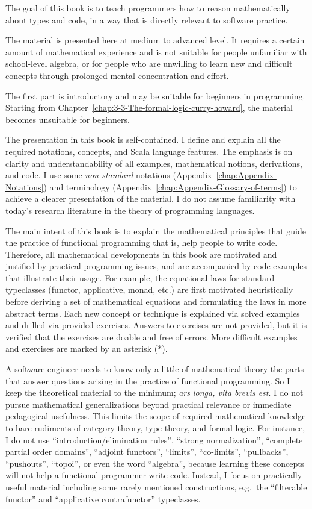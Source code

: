 

The goal of this book is to teach programmers how to reason mathematically
about types and code, in a way that is directly relevant to software
practice.

The material is presented here at medium to advanced level. It requires
a certain amount of mathematical experience and is not suitable for
people unfamiliar with school-level algebra, or for people who are
unwilling to learn new and difficult concepts through prolonged mental
concentration and effort.

The first part is introductory and may be suitable for beginners in
programming. Starting from Chapter~\ref{chap:3-3-The-formal-logic-curry-howard},
the material becomes unsuitable for beginners. 

The presentation in this book is self-contained. I define and explain
all the required notations, concepts, and Scala language features.
The emphasis is on clarity and understandability of all examples,
mathematical notions, derivations, and code. I use some \emph{non-standard}
notations (Appendix~\ref{chap:Appendix-Notations}) and terminology
(Appendix~\ref{chap:Appendix-Glossary-of-terms}) to achieve a clearer
presentation of the material. I do not assume familiarity with today's
research literature in the theory of programming languages.

The main intent of this book is to explain the mathematical principles
that guide the practice of functional programming \textendash{} that
is, help people to write code. Therefore, all mathematical developments
in this book are motivated and justified by practical programming
issues, and are accompanied by code examples that illustrate their
usage. For example, the equational laws for standard typeclasses (functor,
applicative, monad, etc.) are first motivated heuristically before
deriving a set of mathematical equations and formulating the laws
in more abstract terms. Each new concept or technique is explained
via solved examples and drilled via provided exercises. Answers to
exercises are not provided, but it is verified that the exercises
are doable and free of errors. More difficult examples and exercises
are marked by an asterisk ({*}).

A software engineer needs to know only a little of mathematical theory
\textendash{} the parts that answer questions arising in the practice
of functional programming. So I keep the theoretical material to the
minimum; \emph{ars longa, vita brevis est}. I do not pursue mathematical
generalizations beyond practical relevance or immediate pedagogical
usefulness. This limits the scope of required mathematical knowledge
to bare rudiments of category theory, type theory, and formal logic.
For instance, I do not use ``introduction/elimination rules'', ``strong
normalization'', ``complete partial order domains'', ``adjoint
functors'', ``limits'', ``co-limits'', ``pullbacks'', ``pushouts'',
``topoi'', or even the word ``algebra'', because learning these
concepts will not help a functional programmer write code. Instead,
I focus on practically useful material \textendash{} including some
rarely mentioned constructions, e.g.~the ``filterable functor''
and ``applicative contrafunctor'' typeclasses.

